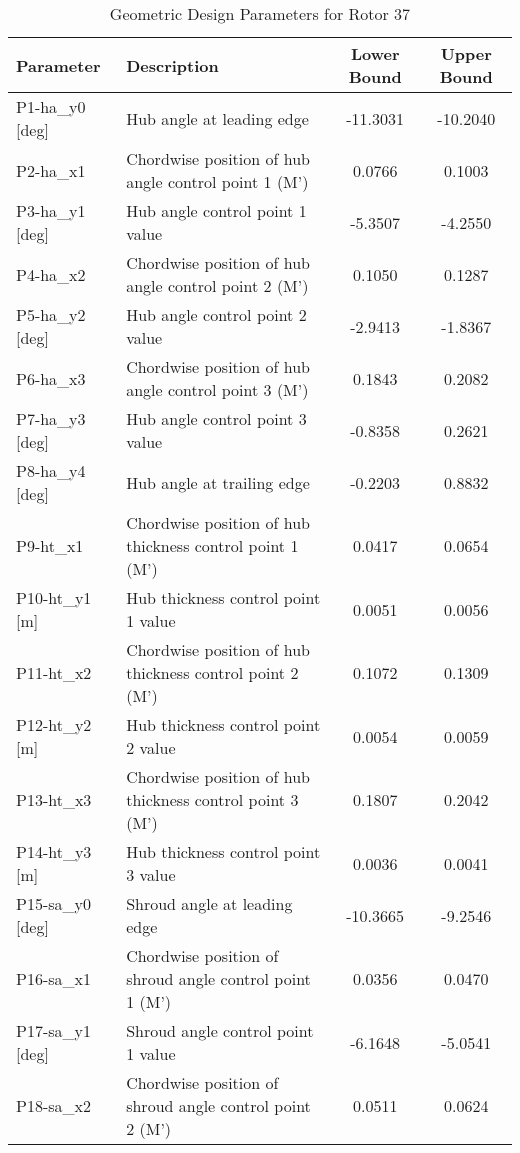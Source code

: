 \documentclass[dsc, EN]{ufabcFHZh}
\begin{document}
\begin{table}[htbp]
  \centering
  \caption{Geometric Design Parameters for Rotor 37}
  \label{tab:rotor_37_parameters}
  \small %
  \begin{tabular}{|l|l|c|c|}
    \hline
    \textbf{Parameter} & \textbf{Description} & \textbf{Lower Bound} & \textbf{Upper Bound} \\
    \hline
    P1-ha\_y0 [deg] & Hub angle at leading edge & -11.3031 & -10.2040 \\
    P2-ha\_x1 & Chordwise position of hub angle control point 1 (M') & 0.0766 & 0.1003 \\
    P3-ha\_y1 [deg] & Hub angle control point 1 value & -5.3507 & -4.2550 \\
    P4-ha\_x2 & Chordwise position of hub angle control point 2 (M') & 0.1050 & 0.1287 \\
    P5-ha\_y2 [deg] & Hub angle control point 2 value & -2.9413 & -1.8367 \\
    P6-ha\_x3 & Chordwise position of hub angle control point 3 (M') & 0.1843 & 0.2082 \\
    P7-ha\_y3 [deg] & Hub angle control point 3 value & -0.8358 & 0.2621 \\
    P8-ha\_y4 [deg] & Hub angle at trailing edge & -0.2203 & 0.8832 \\
    P9-ht\_x1 & Chordwise position of hub thickness control point 1 (M') & 0.0417 & 0.0654 \\
    P10-ht\_y1 [m] & Hub thickness control point 1 value & 0.0051 & 0.0056 \\
    P11-ht\_x2 & Chordwise position of hub thickness control point 2 (M') & 0.1072 & 0.1309 \\
    P12-ht\_y2 [m] & Hub thickness control point 2 value & 0.0054 & 0.0059 \\
    P13-ht\_x3 & Chordwise position of hub thickness control point 3 (M') & 0.1807 & 0.2042 \\
    P14-ht\_y3 [m] & Hub thickness control point 3 value & 0.0036 & 0.0041 \\
    P15-sa\_y0 [deg] & Shroud angle at leading edge & -10.3665 & -9.2546 \\
    P16-sa\_x1 & Chordwise position of shroud angle control point 1 (M') & 0.0356 & 0.0470 \\
    P17-sa\_y1 [deg] & Shroud angle control point 1 value & -6.1648 & -5.0541 \\
    P18-sa\_x2 & Chordwise position of shroud angle control point 2 (M') & 0.0511 & 0.0624 \\

\end{tabular}
\end{table}
\end{document}
